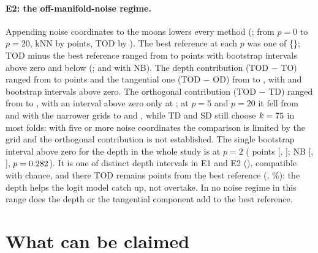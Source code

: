 \documentclass[10pt,a4paper]{article}
\theoremstyle{plain}
\theoremstyle{definition}
\theoremstyle{remark}
\newcommand{\meth}[1]{\textsf{#1}}
\begin{document}
\paragraph{E2: the off-manifold-noise regime.} Appending noise coordinates to the moons lowers every method (; from $p=0$ to $p=20$, \meth{kNN} by \RegKnnDrop{} points, \meth{TOD} by \RegTodDrop). The best reference at each $p$ was one of \{\RegBestSet\}; \meth{TOD} minus the best reference ranged from \RegDeltaMin{} to \RegDeltaMax{} points with \NRegSigWins{} bootstrap intervals above zero and \NRegSigLosses{} below (\RegSigLossesList; \NRegSigWinsNb{} and \NRegSigLossesNb{} with NB). The depth contribution (\meth{TOD} $-$ \meth{TO}) ranged from \RegAblDepthMin{} to \RegAblDepthMax{} points and the tangential one (\meth{TOD} $-$ \meth{OD}) from \RegAblTangMin{} to \RegAblTangMax, with \NRegAblDepthCiAboveZero{} and \NRegAblTangCiAboveZero{} bootstrap intervals above zero. The orthogonal contribution (\meth{TOD} $-$ \meth{TD}) ranged from \RegAblOrthMin{} to \RegAblOrthMax, with an interval above zero only at \RegAblOrthCiAboveList; at $p=5$ and $p=20$ it fell from \VtwoRegAblTdPFive{} and \VtwoRegAblTdPTwenty{} with the narrower grids to \RegAblOrthPFive{} and \RegAblOrthPTwenty, while \meth{TD} and \meth{SD} still choose $k=75$ in most folds: with five or more noise coordinates the comparison is limited by the grid and the orthogonal contribution is not established. The single bootstrap interval above zero for the depth in the whole study is at $p=2$ (\RegAblDepthPTwo{} points [\RegAblDepthLoPTwo, \RegAblDepthHiPTwo]; NB [\RegAblDepthNbLoPTwo, \RegAblDepthNbHiPTwo], $p=0.282$). It is one of \NDepthIntervals{} distinct depth intervals in E1 and E2 (\RegReusedNote), compatible with chance, and there \meth{TOD} remains \RegDeltaPTwo{} points from the best reference (\RegBestPTwo, \RegBestAccPTwo\%): the depth helps the logit model catch up, not overtake. In no noise regime in this range does the depth or the tangential component add to the best reference.

\section{What can be claimed}\label{sec:claims}
\end{document}
